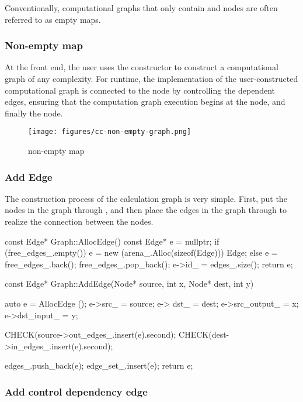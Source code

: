 \begin{content}
Conventionally, computational graphs that only contain  and  nodes are often referred to as empty maps.

\subsubsection{Non-empty map}

At the front end, the user uses the  constructor to construct a computational graph of any complexity. For runtime, the implementation of the user-constructed computational graph is connected to the  node by controlling the dependent edges, ensuring that the computation graph execution begins at the  node, and finally the  node.

\begin{figure}[H]
\centering
\texttt{[image: figures/cc-non-empty-graph.png]}
\caption{non-empty map}
 \label{fig:cc-non-empty-graph}
\end{figure}

\subsubsection{Add Edge}

The construction process of the calculation graph is very simple. First, put the nodes in the graph through , and then place the edges in the graph through  to realize the connection between the nodes.

\begin{leftbar}
\begin{c++}
const Edge* Graph::AllocEdge() const {
  Edge* e = nullptr;
  if (free_edges_.empty()) {
    e = new (arena_.Alloc(sizeof(Edge))) Edge;
  } else {
    e = free_edges_.back();
    free_edges_.pop_back();
  }
  e->id_ = edges_.size();
  return e;
}

const Edge* Graph::AddEdge(Node* source, int x, Node* dest, int y) {
  auto e = AllocEdge ();
  e->src_ = source;
  e-> dst_ = dest;
  e->src_output_ = x;
  e->dst_input_ = y;

  CHECK(source->out_edges_.insert(e).second);
  CHECK(dest->in_edges_.insert(e).second);

  edges_.push_back(e);
  edge_set_.insert(e);
  return e;
}
\end{c++}
\end{leftbar}

\subsubsection{Add control dependency edge}


\end{content}
